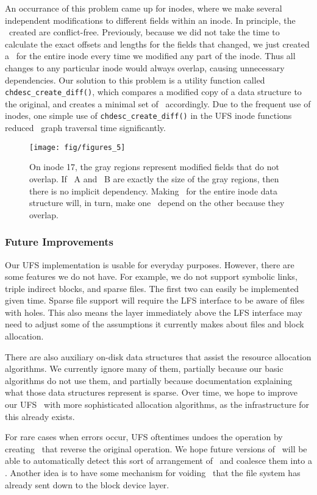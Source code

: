 An occurrance of this problem came up for inodes, where we make several
independent modifications to different fields within an inode. In principle,
the \chdescs\ created are conflict-free. Previously, because we did not take
the time to calculate the exact offsets and lengths for the fields that
changed, we just created a \chdesc\ for the entire inode every time we modified
any part of the inode. Thus all changes to any particular inode would always
overlap, causing unnecessary dependencies. Our solution to this problem is a
utility function called \texttt{chdesc\_create\_diff()}, which compares a
modified copy of a data structure to the original, and creates a minimal set of
\chdescs\ accordingly. Due to the frequent use of inodes, one simple use of
\texttt{chdesc\_create\_diff()} in the UFS inode functions reduced \chdesc\
graph traversal time significantly.

\begin{figure}[htb]
  \centering
  \texttt{[image: fig/figures\_5]}
  \caption{\label{fig:overlap} On inode 17, the gray regions represent
  modified fields that do not overlap. If \chdesc\ A and \chdesc\ B are
  exactly the size of the gray regions, then there is no implicit dependency.
  Making \chdescs\ for the entire inode data structure will, in turn, make
  one \chdesc\ depend on the other because they overlap.}
\end{figure}

\subsubsection {Future Improvements}
Our UFS implementation is usable for everyday purposes. However, there are
some features we do not have. For example, we do not support symbolic links,
triple indirect blocks, and sparse files. The first two can easily be
implemented given time. Sparse file support will require the LFS interface to
be aware of files with holes. This also means the layer immediately above the
LFS interface may need to adjust some of the assumptions it currently makes
about files and block allocation.

There are also auxiliary on-disk data structures that assist the resource
allocation algorithms. We currently ignore many of them, partially because
our basic algorithms do not use them, and partially because documentation
explaining what those data structures represent is sparse. Over time, we
hope to improve our UFS \module\ with more sophisticated allocation
algorithms, as the infrastructure for this already exists.

For rare cases when errors occur, UFS oftentimes undoes the operation by
creating \chdescs\ that reverse the original operation. We hope future
versions of \Kudos\ will be able to automatically detect this sort of
arrangement of \chdescs\ and coalesce them into a \noop. Another idea is to
have some mechanism for voiding \chdescs\ that the file system has already
sent down to the block device layer.
